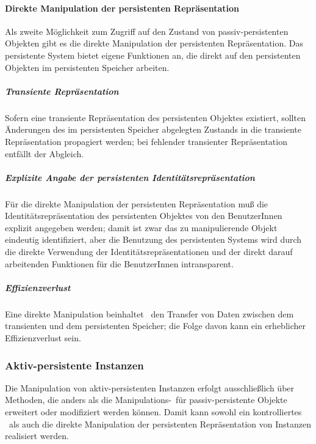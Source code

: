 \paragraph{Direkte Manipulation der persistenten Repr\"{a}sentation}%
%
Als zweite M\"{o}glichkeit zum Zugriff auf den Zustand von
passiv-persistenten Objekten gibt es die direkte Manipulation der
persistenten Repr\"{a}sentation.  Das persistente System bietet eigene
Funktionen an, die direkt auf den persistenten Objekten im
persistenten Speicher arbeiten.
%
\subparagraph{Transiente Repr\"{a}sentation}%
%
Sofern eine transiente Repr\"{a}sentation des persistenten Objektes
existiert, sollten \"{A}nderungen des im persistenten Speicher abgelegten
Zustands in die transiente Repr\"{a}sentation propagiert werden; bei
fehlender transienter Repr\"{a}sentation entf\"{a}llt der Abgleich.
%
\subparagraph{Explizite Angabe der persistenten
Iden\-ti\-t\"{a}ts\-re\-pr\"{a}\-sen\-ta\-tion}%
%
F\"{u}r die direkte Manipulation der persistenten Repr\"{a}sentation mu\ss{}
die Identit\"{a}tsrepr\"{a}sentation des persistenten Objektes von den
BenutzerInnen explizit angegeben werden; damit ist zwar das zu
manipulierende Objekt eindeutig identifiziert, aber die Benutzung des
persistenten Systems wird durch die direkte Verwendung der
Iden\-ti\-t\"{a}ts\-re\-pr\"{a}\-sen\-ta\-tio\-nen und der direkt
darauf arbeitenden Funktionen f\"{u}r die BenutzerInnen intransparent.
%
\subparagraph{Effizienzverlust}%
%
Eine direkte Manipulation beinhaltet \ia\ den Transfer von
Daten zwischen dem transienten und dem persistenten Speicher; die
Folge davon kann ein erheblicher Effizienzverlust sein.
%
\subsubsection{Aktiv-persistente Instanzen}%
%
Die Manipulation von aktiv-persistenten Instanzen erfolgt
ausschlie\ss{}lich \"{u}ber Methoden, die anders als die
Manipulations-\mtd[n]\ f\"{u}r passiv-persistente Objekte erweitert
oder modifiziert werden k\"{o}nnen. Damit kann sowohl ein kontrolliertes
\swizzling\ als auch die direkte Manipulation der persistenten
Repr\"{a}sentation von Instanzen realisiert werden.
%
%
%
